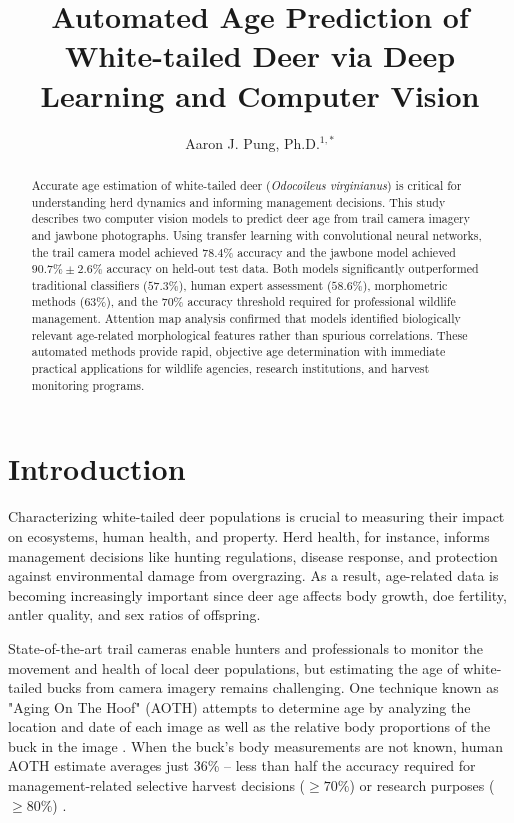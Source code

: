 \documentclass{iopjournal}
\begin{document}

\title{Automated Age Prediction of White-tailed Deer via Deep Learning and Computer Vision}

\author{Aaron J. Pung, Ph.D.$^{1,*}$}



\begin{abstract}
Accurate age estimation of white-tailed deer (\textit{Odocoileus virginianus}) is critical for understanding herd dynamics and informing management decisions. This study describes two computer vision models to predict deer age from trail camera imagery and jawbone photographs. Using transfer learning with convolutional neural networks, the trail camera model achieved $78.4\%$ accuracy and the jawbone model achieved $90.7\% \pm 2.6\%$ accuracy on held-out test data. Both models significantly outperformed traditional classifiers ($57.3\%$), human expert assessment ($58.6\%$), morphometric methods ($63\%$), and the $70\%$ accuracy threshold required for professional wildlife management. Attention map analysis confirmed that models identified biologically relevant age-related morphological features rather than spurious correlations. These automated methods provide rapid, objective age determination with immediate practical applications for wildlife agencies, research institutions, and harvest monitoring programs.
\end{abstract}

\section{Introduction}
Characterizing white-tailed deer populations is crucial to measuring their impact on ecosystems, human health, and property. Herd health, for instance, informs management decisions like hunting regulations, disease response, and protection against environmental damage from overgrazing. As a result, age-related data is becoming increasingly important since deer age affects body growth, doe fertility, antler quality, and sex ratios of offspring.

State-of-the-art trail cameras enable hunters and professionals to monitor the movement and health of local deer populations, but estimating the age of white-tailed bucks from camera imagery remains challenging. One technique known as "Aging On The Hoof" (AOTH) attempts to determine age by analyzing the location and date of each image as well as the relative body proportions of the buck in the image \cite{1996Kroll, 1978Knowlton, 1999Demarais, 2003Richards, 2008Hellickson}. When the buck's body measurements are not known, human AOTH estimate averages just 36\% -- less than half the accuracy required for management-related selective harvest decisions ($\geq70\%$) or research purposes ($\geq80\%$) \cite{2014Gee}. 
\end{document}
